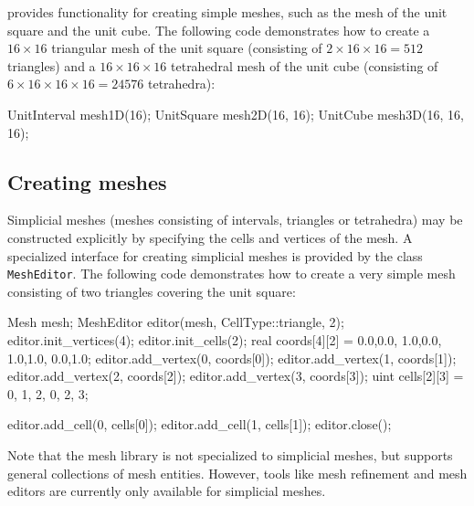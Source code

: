\dolfin{} provides functionality for creating simple meshes, such as
the mesh of the unit square and the unit cube. The following code
demonstrates how to create a $16\times 16$ triangular mesh of the unit square
(consisting of $2\times 16\times 16 = 512$ triangles) and a
$16\times 16\times 16$ tetrahedral mesh of the unit cube (consisting
of $6\times 16\times 16\times 16 = 24576$ tetrahedra):
\begin{code}
UnitInterval mesh1D(16);
UnitSquare mesh2D(16, 16);
UnitCube mesh3D(16, 16, 16);
\end{code}


\subsection{Creating meshes}

Simplicial meshes (meshes consisting of intervals, triangles or
tetrahedra) may be constructed explicitly by specifying the
cells and vertices of the mesh. A specialized interface for creating
simplicial meshes is provided by the class \texttt{MeshEditor}.
The following code demonstrates how to create a very simple mesh
consisting of two triangles covering the unit square:
\begin{code}
Mesh mesh;
MeshEditor editor(mesh, CellType::triangle, 2);
editor.init_vertices(4);
editor.init_cells(2);
real coords[4][2] = {{0.0,0.0},
                     {1.0,0.0},
                     {1.0,1.0},
                     {0.0,1.0}};
editor.add_vertex(0, coords[0]);
editor.add_vertex(1, coords[1]);
editor.add_vertex(2, coords[2]);
editor.add_vertex(3, coords[3]);
uint cells[2][3] = {{0, 1, 2},
                    {0, 2, 3}};

editor.add_cell(0, cells[0]);
editor.add_cell(1, cells[1]);
editor.close();
\end{code}
Note that the \dolfin{} mesh library is not specialized to simplicial
meshes, but supports general collections of mesh entities. However,
tools like mesh refinement and mesh editors are currently only
available for simplicial meshes.
